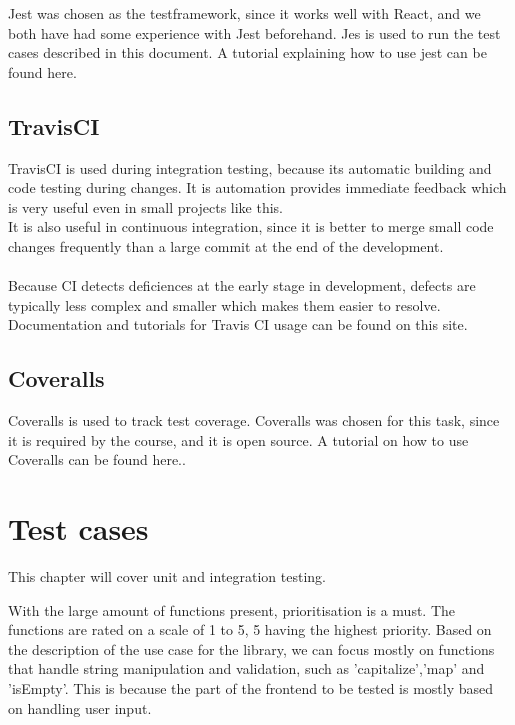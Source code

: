 \documentclass[a4paper, 12pt]{article}
\begin{document}
    Jest\cite{Jest} was chosen as the testframework, since it works well with React, and we both have had some experience with Jest beforehand.
    Jes is used to run the test cases described in this document. A tutorial explaining how to use jest can be found here.\cite{JestTutorial}

    \subsection{TravisCI}
    
    TravisCI\cite{Travis} is used during integration testing, because its automatic building and code testing during changes. It is automation provides immediate feedback which 
    is very useful even in small projects like this.
    \\
     It is also useful in continuous integration, since it is better to merge small code changes frequently than a large commit at 
    the end of the development.
    \\
    \\
     Because CI detects deficiences at the early stage in development, defects are typically less complex and smaller which makes them easier to resolve.
    Documentation and tutorials for Travis CI usage can be found on this site. \cite{TravisTutorial}

    \subsection{Coveralls}

    Coveralls\cite{coveralls} is used to track test coverage. Coveralls was chosen for this task, since it is required by the course, and it is open source. 
    A tutorial on how to use Coveralls can be found here.\cite{coverallsTutorial}.

\section{Test cases}
This chapter will cover unit and integration testing.

With the large amount of functions present, prioritisation is a must. The functions are rated on a scale of 1 to 5, 5 having the highest priority.
Based on the description of the use case for the library, we can focus mostly on functions that handle string manipulation and validation,
such as 'capitalize','map' and 'isEmpty'. This is because the part of the frontend to be tested  is mostly based on handling user input.
\\\\
\end{document}
